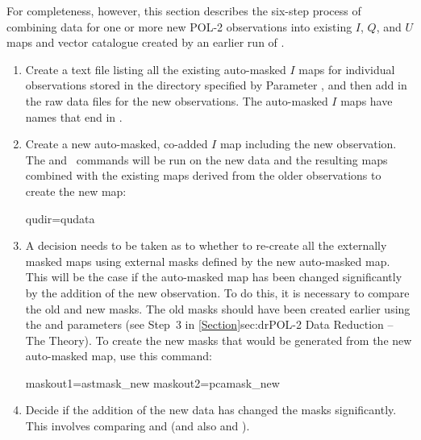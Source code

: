 For completeness, however, this section describes the six-step process of
combining data for one or more new POL-2 observations into existing $I$, $Q$,
and $U$ maps and vector catalogue created by an earlier run of \poltwomap.
\begin{enumerate}

\item Create a text file listing all the existing auto-masked $I$ maps
  for individual observations stored in the directory specified by
  Parameter , and then add in the raw data files for the new
  observations. The auto-masked $I$ maps have names that end in
  .

\begin{terminalv}
\end{terminalv}


\item Create a new auto-masked, co-added $I$ map including the new
  observation. The  and \makemap\ commands
  will be run on the new
  data and the resulting maps combined with the existing maps derived
  from the older observations to create the new map:

\begin{terminalv}
     qudir=qudata
\end{terminalv}


\item A decision needs to be taken as to whether to re-create all the
  externally masked maps using external masks defined by the new
  auto-masked map. This will be the case if the auto-masked map has
  been changed significantly by the addition of the new
  observation. To do this, it is necessary to compare the old and new
  masks. The old masks should have been created earlier using the
   and  parameters (see Step~3 in
  \cref{Section}{sec:dr}{POL-2 Data Reduction -- The Theory}). To
  create the new masks that would be generated from the new
  auto-masked map, use this command:

\begin{terminalv}
     maskout1=astmask_new  maskout2=pcamask_new
\end{terminalv}

\item Decide if the addition of the new data has changed the masks
  significantly. This involves comparing  and
   (and also  and
  ).



\end{enumerate}
